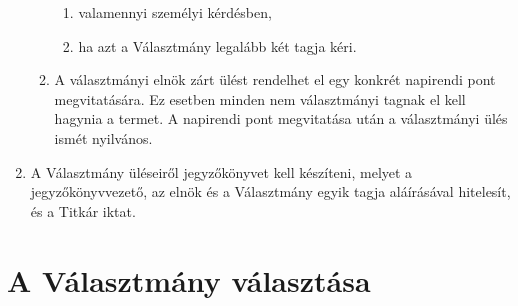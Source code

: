 \documentclass{../styles/rulebook}
\begin{document}
\begin{enumerate}
\begin{enumerate}
		\begin{enumerate}
			\item valamennyi személyi kérdésben,
			\item ha azt a Választmány legalább két tagja kéri.
		\end{enumerate}
		\item A választmányi elnök zárt ülést rendelhet el egy konkrét napirendi pont megvitatására. Ez esetben minden nem választmányi tagnak el kell hagynia a termet. A napirendi pont megvitatása után a választmányi ülés ismét nyilvános.
	\end{enumerate}
	\item A Választmány üléseiről jegyzőkönyvet kell készíteni, melyet a jegyzőkönyvvezető, az elnök és a Választmány egyik tagja aláírásával hitelesít, és a Titkár iktat.
\end{enumerate}

\section{A Választmány választása}
\end{document}
